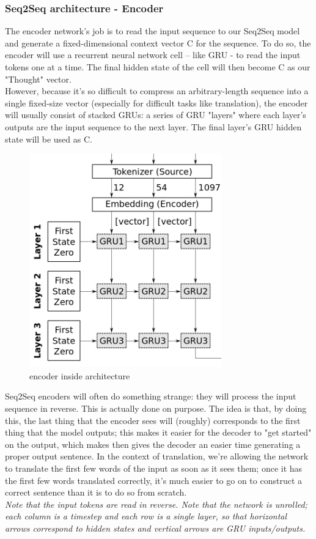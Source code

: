   \subsubsection{Seq2Seq architecture - Encoder}
  The encoder network’s job is to read the input sequence to our
Seq2Seq model and generate a fixed-dimensional context vector C
for the sequence. To do so, the encoder will use a recurrent neural
network cell – like GRU - to read the input tokens one at a time. The final hidden state of the cell will then become C as our "Thought" vector.\\
 However,
because it’s so difficult to compress an arbitrary-length sequence into
a single fixed-size vector (especially for difficult tasks like translation),
the encoder will usually consist of stacked GRUs: a series of
GRU "layers" where each layer’s outputs are the input sequence to
the next layer. The final layer’s GRU hidden state will be used as C.
 \begin{figure}[H]%
    \center%
    \includegraphics[width=.5\textwidth]{images/amir/enc.png}%
    \caption[This is a encoder image]{ encoder inside architecture \cite{web018}
    }\label{fig:encoder}%
  \end{figure}
Seq2Seq encoders will often do something strange: they will process
the input sequence in reverse. This is actually done on purpose.
The idea is that, by doing this, the last thing that the encoder sees
will (roughly) corresponds to the first thing that the model outputs;
this makes it easier for the decoder to "get started" on the output,
which makes then gives the decoder an easier time generating a
proper output sentence. In the context of translation, we’re allowing
the network to translate the first few words of the input as soon as it sees them; once it has the first few words translated correctly, it’s
much easier to go on to construct a correct sentence than it is to do
so from scratch. \\
\textit{Note that the input
tokens are read in reverse. Note that the
network is unrolled; each column is a
timestep and each row is a single layer,
so that horizontal arrows correspond
to hidden states and vertical arrows are
GRU inputs/outputs.}
